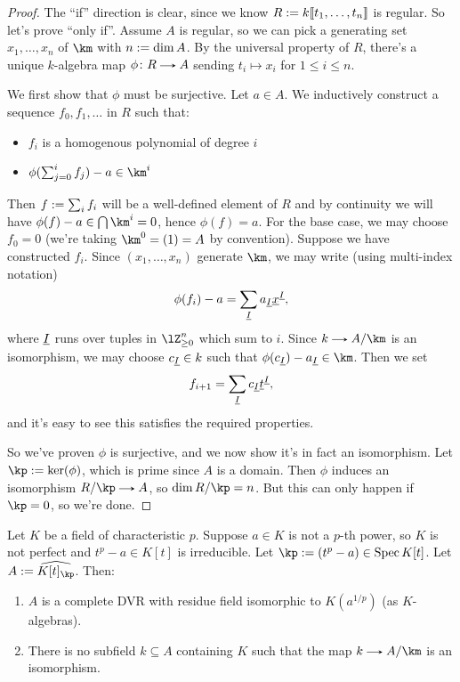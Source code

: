 \begin{proof}
  The ``if'' direction is clear, since we know $R \mathrel{:=} k\llbracket t_1,\ldots,t_n \rrbracket$ is regular. So let's prove ``only if''. Assume $A$ is regular, so we can pick a generating set $x_1,\ldots,x_n$ of $\km$ with $n \mathrel{:=} \dim A$. By the universal property of $R$, there's a unique $k$-algebra map $\phi \c R \to A$ sending $t_i \mapsto x_i$ for $1 \le i \le n$.

  We first show that $\phi$ must be surjective. Let $a \in A$. We inductively construct a sequence $f_0,f_1,\ldots$ in $R$ such that:
  \begin{itemize}
  \item $f_i$ is a homogenous polynomial of degree $i$
  \item $\phi(\sum_{j=0}^i f_j) - a \in \km^i$
  \end{itemize}
  Then $f \mathrel{:=} \sum_i f_i$ will be a well-defined element of $R$ and by continuity we will have $\phi(f) - a \in \bigcap \km^i = 0$, hence $\phi(f) = a$.
  For the base case, we may choose $f_0 = 0$ (we're taking $\km^0 = (1) = A$ by convention). Suppose we have constructed $f_i$. Since $(x_1,\ldots,x_n)$ generate $\km$, we may write (using multi-index notation)
  \[
    \phi(f_i) - a = \sum_{\underline I} a_{\underline I} \underline x^{\underline I},
  \]
  where $\underline I$ runs over tuples in $\lZ_{\ge 0}^n$ which sum to $i$. Since $k \to A/\km$ is an isomorphism, we may choose $c_{\underline I} \in k$ such that $\phi(c_{\u I}) - a_{\u I} \in \km$. Then we set
  \[
    f_{i+1} = \sum_{\underline I} c_{\underline I} \underline t^{\underline I},
  \]
  and it's easy to see this satisfies the required properties.

  So we've proven $\phi$ is surjective, and we now show it's in fact an isomorphism. Let $\kp \ce \ker(\phi)$, which is prime since $A$ is a domain. Then $\phi$ induces an isomorphism $R/\kp \to A$, so $\dim R/\kp = n$. But this can only happen if $\kp = 0$, so we're done.
\end{proof}

\begin{proposition}
  \label{nonperfect-weird}
  Let $K$ be a field of characteristic $p$. Suppose $a \in K$ is not a $p$-th power, so $K$ is not perfect and $t^p - a \in K[t]$ is irreducible. Let $\kp \ce (t^p - a) \in \Spec K[t]$. Let $A \ce \hat{K[t]_\kp}$. Then:
  \begin{enumerate}
  \item \label{nonperfect-weird-normalness} $A$ is a complete DVR with residue field isomorphic to $K(a^{1/p})$ (as $K$-algebras).
  \item \label{nonperfect-weird-weirdness} There is no subfield $k \subseteq A$ containing $K$ such that the map $k \to A/\km$ is an isomorphism.
  \end{enumerate}
\end{proposition}

